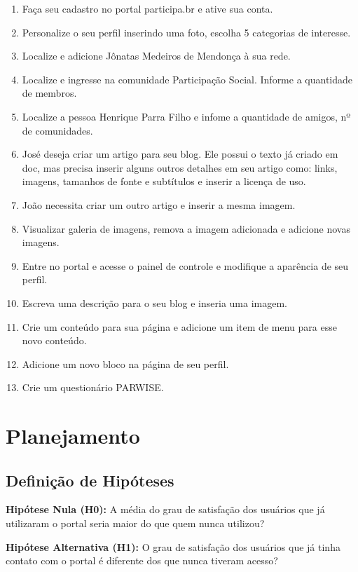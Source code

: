 \begin{enumerate}
	\item Faça seu cadastro no portal participa.br e ative sua conta.
	\item Personalize o seu perfil inserindo uma foto, escolha 5 categorias de interesse.
	\item Localize e adicione Jônatas Medeiros de Mendonça à sua rede.
	\item Localize e ingresse na comunidade Participação Social. Informe a quantidade de membros.
	\item Localize a pessoa Henrique Parra Filho e infome a quantidade de amigos, nº de comunidades.
	\item José deseja criar um artigo para seu blog. Ele possui o texto já criado em doc, mas precisa inserir alguns outros detalhes em seu artigo como: links, imagens, tamanhos de fonte e subtítulos e inserir a licença de uso.
	\item João necessita criar um outro artigo e inserir a mesma imagem.
	\item Visualizar galeria de imagens, remova a imagem adicionada e adicione novas imagens.
	\item Entre no portal e acesse o painel de controle e modifique a aparência de seu perfil.
	\item Escreva uma descrição para o seu blog e inseria uma imagem.
	\item Crie um conteúdo para sua página e adicione um item de menu para esse novo conteúdo.
	\item Adicione um novo bloco na página de seu perfil.
	\item Crie um questionário PARWISE.
\end{enumerate}

\section{Planejamento}

\subsection{Definição de Hipóteses}

\textbf{Hipótese Nula (H0):} A média do grau de satisfação dos usuários que já utilizaram o portal seria maior do que quem nunca utilizou?

\textbf{Hipótese Alternativa (H1):} O grau de satisfação dos usuários que já tinha contato com o portal é diferente dos que nunca tiveram acesso?

